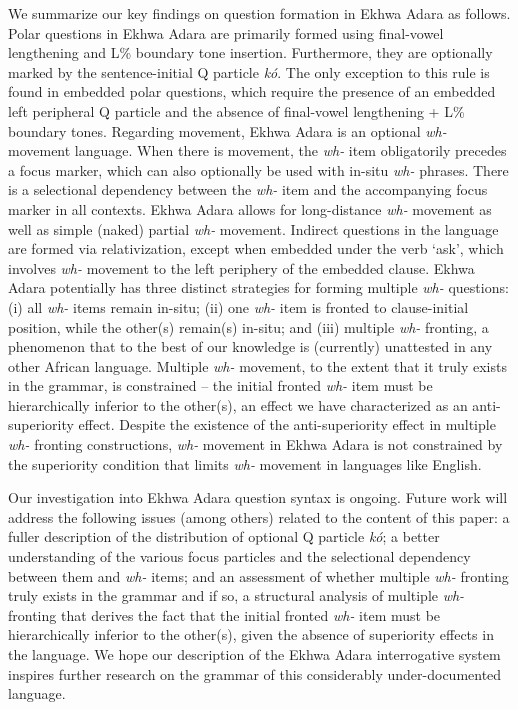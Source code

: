 \documentclass[output=paper,colorlinks,citecolor=brown
]{langscibook}
\begin{document}
We summarize our key findings on question formation in Ekhwa Adara as follows. Polar questions in Ekhwa Adara are primarily formed using final-vowel lengthening and L\% boundary tone insertion. Furthermore, they are optionally marked by the sentence-initial Q particle \textit{kó}. The only exception to this rule is found in embedded polar questions, which require the presence of an embedded left peripheral Q particle and the absence of final-vowel lengthening + L\% boundary tones. Regarding movement, Ekhwa Adara is an optional \textit{wh-} movement language. When there is movement, the \textit{wh-} item obligatorily precedes a focus marker, which can also optionally be used with in-situ \textit{wh-} phrases. There is a selectional dependency between the \textit{wh-} item and the accompanying focus marker in all contexts. Ekhwa Adara allows for long-distance \textit{wh-} movement as well as simple (naked) partial \textit{wh-} movement. Indirect questions in the language are formed via relativization, except when embedded under the verb `ask', which involves \textit{wh-} movement to the left periphery of the embedded clause. Ekhwa Adara potentially has three distinct strategies for forming multiple \textit{wh-} questions: (i) all \textit{wh-} items remain in-situ; (ii) one \textit{wh-} item is fronted to clause-initial position, while the other(s) remain(s) in-situ; and (iii) multiple \textit{wh-} fronting, a phenomenon that to the best of our knowledge is (currently) unattested in any other African language. Multiple \textit{wh-} movement, to the extent that it truly exists in the grammar, is constrained – the initial fronted \textit{wh-} item must be hierarchically inferior to the other(s), an effect we have characterized as an anti-superiority effect. Despite the existence of the anti-superiority effect in multiple \textit{wh-} fronting constructions, \textit{wh-} movement in Ekhwa Adara is not constrained by the superiority condition that limits \textit{wh-} movement in languages like English.

Our investigation into Ekhwa Adara question syntax is ongoing. Future work will address the following issues (among others) related to the content of this paper: a fuller description of the distribution of optional Q particle \textit{kó}; a better understanding of the various focus particles and the selectional dependency between them and \textit{wh-} items; and an assessment of whether multiple \textit{wh-} fronting truly exists in the grammar and if so, a structural analysis of multiple \textit{wh-} fronting that derives the fact that the initial fronted \textit{wh-} item must be hierarchically inferior to the other(s), given the absence of superiority effects in the language. We hope our description of the Ekhwa Adara interrogative system inspires further research on the grammar of this considerably under-documented language.
\end{document}
